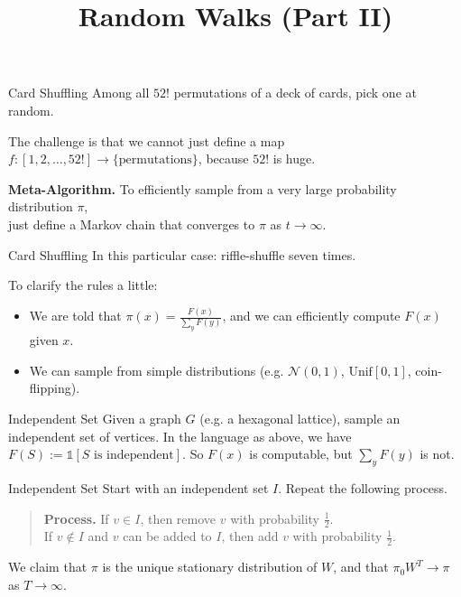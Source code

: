 \title{Random Walks (Part II)}



\begin{problem}{Card Shuffling}
    Among all $52!$ permutations of a deck of cards, pick one at random.
\end{problem}

The challenge is that we cannot just define a map $f: [1, 2, \dots, 52!] \to \{\text{permutations}\}$, because $52!$ is huge.

\begin{center}
    \textbf{Meta-Algorithm.} To efficiently sample from a very large probability distribution $\pi$, \\ just define a Markov chain that converges to $\pi$ as $t \to \infty$.
\end{center}

\begin{solution}{Card Shuffling}
    In this particular case: riffle-shuffle seven times.
\end{solution}

To clarify the rules a little:
\begin{itemize}
    \item We are told that $\pi(x) = \frac{F(x)}{\sum_y F(y)}$, and we can efficiently compute $F(x)$ given $x$.
    \item We can sample from simple distributions (e.g. $\mathcal{N}(0, 1)$, $\mathrm{Unif}[0, 1]$, coin-flipping).
\end{itemize}

\begin{problem}{Independent Set}
    Given a graph $G$ (e.g. a hexagonal lattice), sample an independent set of vertices.  In the language as above, we have $F(S) := \mathds{1}[S \text{ is independent}]$.  So $F(x)$ is computable, but $\sum_{y} F(y)$ is not.
\end{problem}

\begin{solution}{Independent Set}
    Start with an independent set $I$.  Repeat the following process.
    \begin{quote}
        \textbf{Process.} If $v \in I$, then remove $v$ with probability $\frac{1}{2}$. \\
        If $v \not \in I$ and $v$ can be added to $I$, then add $v$ with probability $\frac{1}{2}$.
    \end{quote}
    We claim that $\pi$ is the unique stationary distribution of $W$, and that $\pi_0W^T \to \pi$ as $T \to \infty$.
\end{solution}

